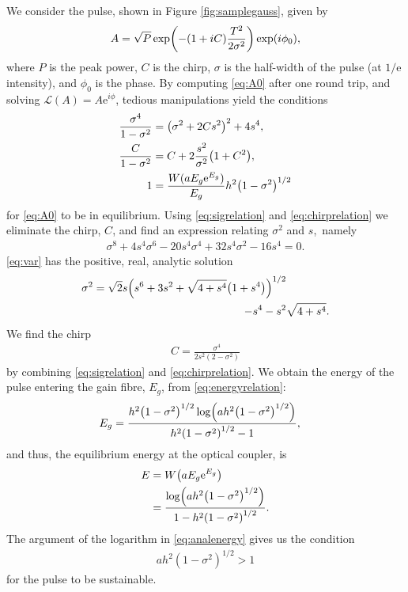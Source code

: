 \documentclass[9pt,twocolumn,twoside]{osajnl}
\let\originalleft\left
\let\originalright\right
\renewcommand{\left}{\mathopen{}\mathclose\bgroup\originalleft}
\renewcommand{\right}{\aftergroup\egroup\originalright}
\begin{document}
We consider the pulse, shown in Figure \ref{fig:samplegauss}, given by
\begin{align}
	A = \sqrt{P} \exp \left( -(1 + iC) \frac{T^2}{2 \sigma^2} \right) \exp(i \phi_0),
	\label{eq:A0}
\end{align}
where $P$ is the peak power, $C$ is the chirp, $\sigma$ is the half-width of the pulse (at $1 / \textrm{e}$ intensity), and $\phi_0$ is the phase. By computing \eqref{eq:A0} after one round trip, and solving $\mathcal{L}(A) = A \textrm{e}^{i \phi}$, tedious manipulations yield the conditions
\begin{align}
	\frac{\sigma^4}{1 - \sigma^2} &= \left( \sigma^2 + 2 C s^2 \right)^2 + 4 s^4, \label{eq:sigrelation} \\
	\frac{C}{1 - \sigma^2} &= C + 2 \frac{s^2}{\sigma^2} \left( 1 + C^2 \right), \label{eq:chirprelation} \\
	1 &= \frac{W(a E_g \textrm{e}^{E_g})}{E_g} h^2 \left( 1 - \sigma^2 \right)^{1/2} \label{eq:energyrelation}
\end{align}
for \eqref{eq:A0} to be in equilibrium. Using \eqref{eq:sigrelation} and \eqref{eq:chirprelation} we eliminate the chirp, $C$, and find an expression relating $\sigma^2$ and $s$,~namely
\begin{align}
	\sigma^8 + 4 s^4 \sigma^6 - 20 s^4 \sigma^4 + 32 s^4 \sigma^2 - 16 s^4 = 0.
	\label{eq:var}
\end{align}
\eqref{eq:var} has the positive, real, analytic solution
\begin{equation}
	\begin{split}
		\sigma^2 = \sqrt{2} s \left( s^6 + 3s^2 + \sqrt{4 + s^4} \left( 1 + s^4 \right) \right)^{1/2} & \\
		- s^4 - s^2 & \sqrt{4 + s^4}.
		\label{eq:equilvar}
	\end{split}
\end{equation}
We find the chirp
\begin{align}
	C = \frac{\sigma^4}{2 s^2 (2 - \sigma^2)}
	\label{eq:chirp}
\end{align}
by combining \eqref{eq:sigrelation} and \eqref{eq:chirprelation}. We obtain the energy of the pulse entering the gain fibre, $E_g$, from \eqref{eq:energyrelation}:
\begin{align}
	E_g &= \frac{h^2 \left( 1 - \sigma^2 \right)^{1/2} \log \left( a h^2 \left( 1 - \sigma^2 \right)^{1/2} \right)}{h^2 \left( 1 - \sigma^2 \right)^{1/2} - 1},
\end{align}
and thus, the equilibrium energy at the optical coupler, is
\begin{align}
	E &= W \left( a E_g \textrm{e}^{E_g} \right) \\
	&= \frac{\log \left( a h^2 \left( 1 - \sigma^2 \right)^{1/2} \right)}{1 - h^2 \left( 1 - \sigma^2 \right)^{1/2}}.
	\label{eq:analenergy}
\end{align}
The argument of the logarithm in \eqref{eq:analenergy} gives us the condition
\begin{align}
	a h^2 (1 - \sigma^2)^{1/2} > 1
	\label{eq:energycond}
\end{align}
for the pulse to be sustainable.
\end{document}
